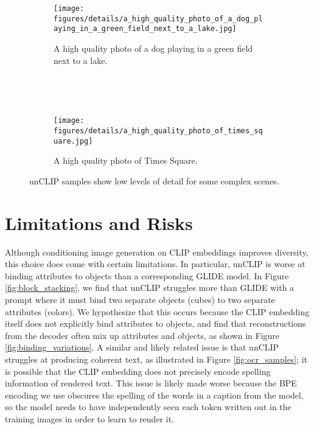 \documentclass{article}
\newcommand{\modelname}{unCLIP}
\begin{document}
\begin{figure}[ht!]
    \begin{center}
    \begin{subfigure}{0.85\textwidth}
        \centering
        \texttt{[image: figures/details/a\_high\_quality\_photo\_of\_a\_dog\_playing\_in\_a\_green\_field\_next\_to\_a\_lake.jpg]}
        \caption{A high quality photo of a dog playing in a green field next to a lake.}
    \end{subfigure} \\
    \rule{0pt}{0.0pt} \\
    \begin{subfigure}{0.85\textwidth}
        \centering
        \texttt{[image: figures/details/a\_high\_quality\_photo\_of\_times\_square.jpg]}
        \caption{A high quality photo of Times Square.}
    \end{subfigure}
    \end{center}
    \caption{\modelname{} samples show low levels of detail for some complex scenes.}
    \label{fig:details}
    \vskip -0.2in
\end{figure}

\section{Limitations and Risks}
\label{sec:limitations}
Although conditioning image generation on CLIP embeddings improves diversity, this choice does come with certain limitations. In particular, \modelname{} is worse at binding attributes to objects than a corresponding GLIDE model. In Figure \ref{fig:block_stacking}, we find that \modelname{} struggles more than GLIDE with a prompt where it must bind two separate objects (cubes) to two separate attributes (colors). We hypothesize that this occurs because the CLIP embedding itself does not explicitly bind attributes to objects, and find that reconstructions from the decoder often mix up attributes and objects, as shown in Figure \ref{fig:binding_variations}. A similar and likely related issue is that \modelname{} struggles at producing coherent text, as illustrated in Figure \ref{fig:ocr_samples}; it is possible that the CLIP embedding does not precisely encode spelling information of rendered text. This issue is likely made worse because the BPE encoding we use obscures the spelling of the words in a caption from the model, so the model needs to have independently seen each token written out in the training images in order to learn to render it.
\end{document}
